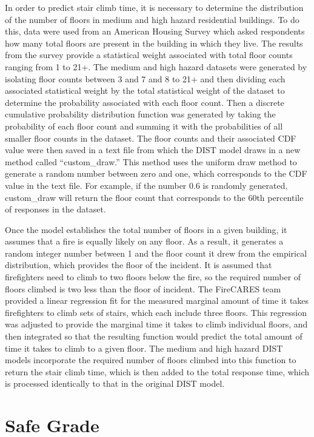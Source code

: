 \documentclass[12pt,oneside]{book}
\begin{document}
In order to predict stair climb time, it is necessary to determine the distribution of the number of floors in medium and high hazard residential buildings. To do this, data were used from an American Housing Survey which asked respondents how many total floors are present in the building in which they live. The results from the survey provide a statistical weight associated with total floor counts ranging from 1 to 21+. The medium and high hazard datasets were generated by isolating floor counts between 3 and 7 and 8 to 21+ and then dividing each associated statistical weight by the total statistical weight of the dataset to determine the probability associated with each floor count. Then a discrete cumulative probability distribution function was generated by taking the probability of each floor count and summing it with the probabilities of all smaller floor counts in the dataset. The floor counts and their associated CDF value were then saved in a text file from which the DIST model draws in a new method called ``custom\_draw.'' This method uses the uniform draw method to generate a random number between zero and one, which corresponds to the CDF value in the text file. For example, if the number 0.6 is randomly generated, custom\_draw will return the floor count that corresponds to the 60th percentile of responses in the dataset. 

Once the model establishes the total number of floors in a given building, it assumes that a fire is equally likely on any floor. As a result, it generates a random integer number between 1 and the floor count it drew from the empirical distribution, which provides the floor of the incident. It is assumed that firefighters need to climb to two floors below the fire, so the required number of floors climbed is two less than the floor of incident.  The FireCARES team provided a linear regression fit for the measured marginal amount of time it takes firefighters to climb sets of stairs, which each include three floors. This regression was adjusted to provide the marginal time it takes to climb individual floors, and then integrated so that the resulting function would predict the total amount of time it takes to climb to a given floor.  The medium and high hazard DIST models incorporate the required number of floors climbed into this function to return the stair climb time, which is then added to the total response time, which is processed identically to that in the original DIST model. 



\chapter{Safe Grade}
\end{document}

